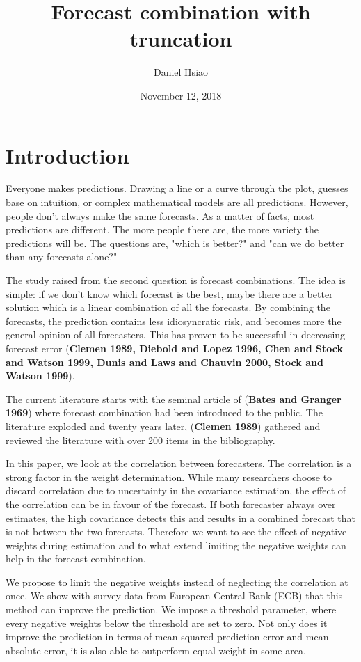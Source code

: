 \documentclass[11pt]{article}
\title{Forecast combination with truncation}
\author{Daniel Hsiao}
\date{November 12, 2018}
\begin{document}
\maketitle
\newpage
{
\setcounter{tocdepth}{3}
\tableofcontents
}
\newpage

\section{Introduction}\label{introduction}
Everyone makes predictions. Drawing a line or a curve through the plot, guesses base on intuition, or complex mathematical models are all predictions. However, people don't always make the same forecasts. As a matter of facts, most predictions are different. The more people there are, the more variety the predictions will be. The questions are, "which is better?" and "can we do better than any forecasts alone?"

The study raised from the second question is forecast combinations. The idea is simple: if we don't know which forecast is the best, maybe there are a better solution which is a linear combination of all the forecasts. By combining the forecasts, the prediction contains less idiosyncratic risk, and becomes more the general opinion of all forecasters. This has proven to be successful in decreasing forecast error (\textbf{Clemen 1989, Diebold and Lopez 1996, Chen and Stock and Watson 1999, Dunis and Laws and Chauvin 2000, Stock and Watson 1999}).

The current literature starts with the seminal article of (\textbf{Bates and Granger 1969}) where forecast combination had been introduced to the public. The literature exploded and twenty years later, (\textbf{Clemen 1989}) gathered and reviewed the literature with over 200 items in the bibliography.

In this paper, we look at the correlation between forecasters. The correlation is a strong factor in the weight determination. While many researchers choose to discard correlation due to uncertainty in the covariance estimation, the effect of the correlation can be in favour of the forecast. If both forecaster always over estimates, the high covariance detects this and results in a combined forecast that is not between the two forecasts. Therefore we want to see the effect of negative weights during estimation and to what extend limiting the negative weights can help in the forecast combination.

We propose to limit the negative weights instead of neglecting the correlation at once. We show with survey data from European Central Bank (ECB) that this method can improve the prediction. We impose a threshold parameter, where every negative weights below the threshold are set to zero. Not only does it improve the prediction in terms of mean squared prediction error and mean absolute error, it is also able to outperform equal weight in some area.
 
\end{document}
